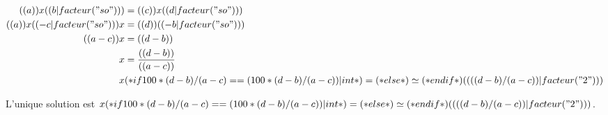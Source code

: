\exercice*

\begin{align*}
  (( a )) x (( b|facteur("so") )) &= (( c )) x (( d|facteur("so") )) \\
  (( a )) x (( -c|facteur("so") ))x &= (( d )) (( -b|facteur("so") )) \\
  (( a - c )) x &= (( d - b )) \\
  x &= \frac{(( d - b ))}{(( a - c ))} \\
  x &
        (* if 100*(d-b)/(a-c) == (100*(d-b)/(a-c))|int *)
            =
        (* else *)
            \simeq
        (* endif *)
        (( ((d-b)/(a-c))|facteur("2") ))
\end{align*}

L'unique solution est
$x
(* if 100*(d-b)/(a-c) == (100*(d-b)/(a-c))|int *)
    =
(* else *)
    \simeq
(* endif *)
(( ((d-b)/(a-c))|facteur("2") ))$.
